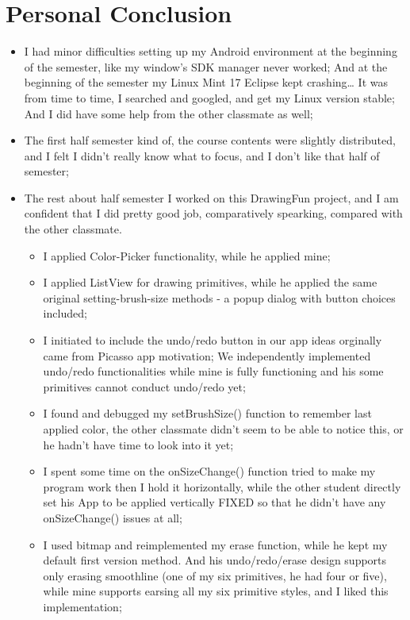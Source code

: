 \documentclass[9pt,b5paper]{article}
\begin{document}
\section{Personal Conclusion}
\label{sec-8}
\begin{itemize}
\item I had minor difficulties setting up my Android environment at the beginning of the semester, like my window's SDK manager never worked; And at the beginning of the semester my Linux Mint 17 Eclipse kept crashing\ldots{} It was from time to time, I searched and googled, and get my Linux version stable; And I did have some help from the other classmate as well;
\item The first half semester kind of, the course contents were slightly distributed, and I felt I didn't really know what to focus, and I don't like that half of semester;
\item The rest about half semester I worked on this DrawingFun project, and I am confident that I did pretty good job, comparatively spearking, compared with the other classmate. 
\begin{itemize}
\item I applied Color-Picker functionality, while he applied mine;
\item I applied ListView for drawing primitives, while he applied the same original setting-brush-size methods - a popup dialog with button choices included;
\item I initiated to include the undo/redo button in our app ideas orginally came from Picasso app motivation; We independently implemented undo/redo functionalities while mine is fully functioning and his some primitives cannot conduct undo/redo yet;
\item I found and debugged my setBrushSize() function to remember last applied color, the other classmate didn't seem to be able to notice this, or he hadn't have time to look into it yet;
\item I spent some time on the onSizeChange() function tried to make my program work then I hold it horizontally, while the other student directly set his App to be applied vertically FIXED so that he didn't have any onSizeChange() issues at all;
\item I used bitmap and reimplemented my erase function, while he kept my default first version method. And his undo/redo/erase design supports only erasing smoothline (one of my six primitives, he had four or five), while mine supports earsing all my six primitive styles, and I liked this implementation;

\end{itemize}
\end{itemize}
\end{document}
